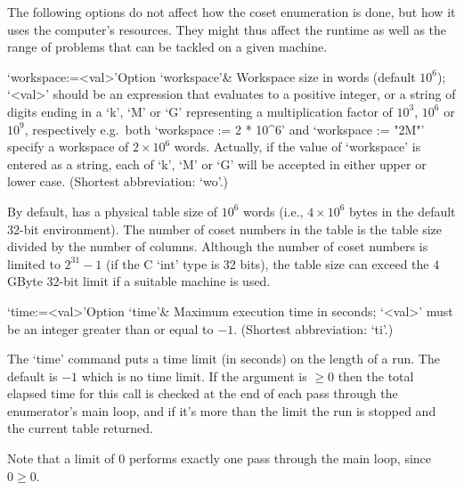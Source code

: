 \enditems


The following options do not affect how the coset enumeration is done,
but how it  uses the computer's resources. They  might thus affect the
runtime as  well as  the range of  problems that  can be tackled  on a
given machine.

\beginitems

\>`workspace:=<val>'{Option `workspace'}&
Workspace size in words (default $10^6$);
`<val>' should be an expression that evaluates to a positive  integer,
or a string of digits ending in a  `k',  `M'  or  `G'  representing  a
multiplication  factor  of  $10^3$,  $10^6$  or  $10^9$,  respectively
e.g.~both `workspace := 2 * 10^6' and `workspace :=  "2M"'  specify  a
workspace  of  $2\times10^6$  words.  Actually,  if   the   value   of
`workspace' is entered as a string, each of `k', `M' or  `G'  will  be
accepted in either upper or lower case. (Shortest abbreviation: `wo'.)

By default, {\ACE} has a physical table size of $10^6$ words (i.e., $4
\times 10^6$ bytes in the  default 32-bit environment).  The number of
coset numbers in the table is  the table size divided by the number of
columns.   Although  the  number   of  coset  numbers  is  limited  to
$2^{31}-1$ (if the C `int' type is 32 bits), the table size can exceed
the $4$GByte 32-bit limit if a suitable machine is used.

\>`time:=<val>'{Option `time'}&
Maximum execution time in seconds; `<val>' must be an integer  greater
than or equal to $-1$. (Shortest abbreviation: `ti'.)

The `time' command  puts a time limit (in seconds) on  the length of a
run. The default is $-1$  which is no  time limit. If the  argument is
$\ge0$ then the total elapsed time for this call is checked at the end
of each pass through the enumerator's main loop, and if it's more than
the limit the run is stopped and the current table returned.

Note that a limit of $0$ performs exactly one pass  through  the  main
loop, since $0 \ge 0$.

%
%
%

